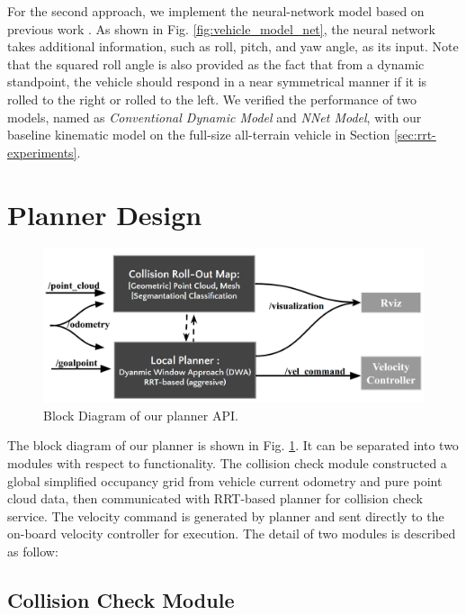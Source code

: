 \documentclass[../thesis.tex]{subfiles}
\begin{document}
For the second approach, we implement the neural-network model based on previous work \cite{bode2007learning}. As shown in Fig. \ref{fig:vehicle_model_net}, the neural network takes additional information, such as roll, pitch, and yaw angle, as its input. Note that the squared roll angle is also provided as the fact that from a dynamic standpoint, the vehicle should respond in a near symmetrical manner if it is rolled to the right or rolled to the left. We verified the performance of two models, named as \textit{Conventional Dynamic Model} and \textit{NNet Model}, with our baseline kinematic model on the full-size all-terrain vehicle in Section \ref{sec:rrt-experiments}.


\section{Planner Design} \label{sec:rrt-planner}


\begin{figure}[t]
	\begin{center}
		\centerline{\includegraphics[width=0.8\columnwidth]{./RRTPlanner/fig/planner_module.png}}
		\caption{Block Diagram of our planner API.}
		\label{fig:planner_module}
	\end{center}
\end{figure} 

The block diagram of our planner is shown in Fig. \ref{fig:planner_module}. It can be separated into two modules with respect to functionality. The collision check module constructed a global simplified occupancy grid from vehicle current odometry and pure point cloud data, then communicated with RRT-based planner for collision check service. The velocity command is generated by planner and sent directly to the on-board velocity controller for execution. The detail of two modules is described as follow:


\subsection{Collision Check Module}
\end{document}
